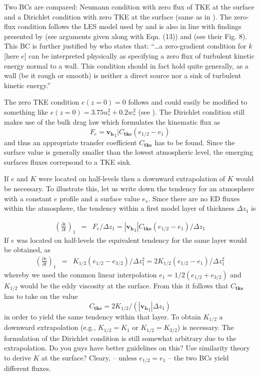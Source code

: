 \documentclass[dvipdfmx,a4paper,10pt]{article}
\begin{document}
Two BCs are compared: Neumann condition with zero flux of TKE at the surface and a Dirichlet condition with zero TKE at the surface (same as in \cite{teixeira04}). The zero-flux condition follows the LES model used by \cite{deardorff74} and is also in line with findings presented by \cite{mcbean75} (see arguments given along with Eqn. (13)) and \cite{lenschow74} (see their Fig. 8). This BC is further justified by \cite{fuhrmann10} who states that:  ``\dots a zero-gradient condition for $k$ [here $e$] can be interpreted physically as specifying a zero flux of turbulent kinetic energy normal to a wall. This condition should in fact hold quite generally, as a wall (be it rough or smooth) is neither a direct source nor a sink of turbulent kinetic energy.''

The zero TKE condition $e(z=0)=0$ follows \cite{teixeira04} and could easily be modified to something like  $e(z=0)=3.75 u_*^2+0.2w_*^2$ (see \cite{witek11}). The Dirichlet condition still makes use of the bulk drag law which formulates the kinematic flux as 
\begin{equation}
 F_e=\mathbf{v_h}_1| C_{\mathbf{tke}} (e_{1/2}-e_1)
\end{equation}
and thus an appropriate transfer coefficient $C_{\mathbf{tke}}$ has to be found. Since the surface value is generally smaller than the lowest atmospheric level, the emerging surfaces fluxes correpsond to a TKE sink. 

If $e$ and $K$ were located on half-levels then a downward extrapolation of $K$ would be necessary. To illustrate this, let us write down the tendency for an atmosphere with a constant $e$ profile and a surface value $e_s$. Since there are no ED fluxes within the atmosphere, the tendency within a first model layer of thickness $\Delta z_1$ is 

\begin{eqnarray}
 \left(\frac{\partial e}{\partial t}\right)_1 &=& F_e/\Delta z_1=|\mathbf{v_h}_1| C_{\mathbf{tke}} (e_{1/2}-e_1)/\Delta z_1
\end{eqnarray}
If $e$ was located on half-levels the equivalent tendency for the same layer would be obtained, as
\begin{eqnarray}
 \left(\frac{\partial e}{\partial t}\right)_1 &=& K_{1/2} (e_{1/2}-e_{3/2})/\Delta z_1^2= 2 K_{1/2} (e_{1/2}-e_{1})/\Delta z_1^2 
\end{eqnarray}
whereby we used the common linear interpolation $e_{1}=1/2(e_{1/2}+e_{3/2})$ and $K_{1/2}$ would be the eddy viscosity at the surface. From this it follows that $C_{\mathbf{tke}}$ has to take on the value 
\begin{equation}
 C_{\mathbf{tke}}= 2 K_{1/2}/ (|\mathbf{v_h}_1|  \Delta z_1)
\end{equation}
in order to yield the same tendency within that layer. To obtain $K_{1/2}$ a downward extrapolation (e.g., $K_{1/2}=K_{1}$ or $K_{1/2}=K_{3/2}$) is necessary. {\color{blue} The formulation of the Dirichlet condition is still somewhat arbitrary due to the extrapolation. Do you guys have better guidelines on this? Use similarity theory to derive $K$ at the surface? }Cleary, -- unless $e_{1/2}=e_{1}$ -- the two BCs yield different fluxes. 
\end{document}
